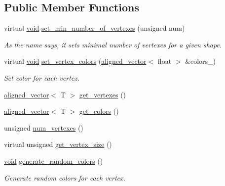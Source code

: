 \subsection*{Public Member Functions}
\begin{DoxyCompactItemize}
\item 
virtual \mbox{\hyperlink{glad_8h_a950fc91edb4504f62f1c577bf4727c29}{void}} \mbox{\hyperlink{classShape_ac5a35fe1b2ecb8fcfc050a31c8969805}{set\+\_\+min\+\_\+number\+\_\+of\+\_\+vertexes}} (unsigned num)
\begin{DoxyCompactList}\small\item\em As the name says, it sets minimal number of vertexes for a given shape. \end{DoxyCompactList}\item 
virtual \mbox{\hyperlink{glad_8h_a950fc91edb4504f62f1c577bf4727c29}{void}} \mbox{\hyperlink{classShape_a69dabd50440dba1ac463ad6819cdb506}{set\+\_\+vertex\+\_\+colors}} (\mbox{\hyperlink{type__definitions_8hpp_a087efd587d66b881646ef378f1919c90}{aligned\+\_\+vector}}$<$ float $>$ \&colors\+\_\+)
\begin{DoxyCompactList}\small\item\em Set color for each vertex. \end{DoxyCompactList}\item 
\mbox{\hyperlink{type__definitions_8hpp_a087efd587d66b881646ef378f1919c90}{aligned\+\_\+vector}}$<$ T $>$ \mbox{\hyperlink{classShape_a3729bbdd0c4e4f3379498734807bb545}{get\+\_\+vertexes}} ()
\item 
\mbox{\hyperlink{type__definitions_8hpp_a087efd587d66b881646ef378f1919c90}{aligned\+\_\+vector}}$<$ T $>$ \mbox{\hyperlink{classShape_aabe9bd208b0ece9824cb45deccc11ba7}{get\+\_\+colors}} ()
\item 
unsigned \mbox{\hyperlink{classShape_a131e85c7f5cad85bffb92e6719117cab}{num\+\_\+vertexes}} ()
\item 
virtual unsigned \mbox{\hyperlink{classShape_a58713d8cf7c4175e7c76eae75c94bc13}{get\+\_\+vertex\+\_\+size}} ()
\item 
\mbox{\hyperlink{glad_8h_a950fc91edb4504f62f1c577bf4727c29}{void}} \mbox{\hyperlink{classShape_aabeb601fe95b412987d5b5c276bf8a7a}{generate\+\_\+random\+\_\+colors}} ()
\begin{DoxyCompactList}\small\item\em Generate random colors for each vertex. \end{DoxyCompactList}\end{DoxyCompactItemize}
